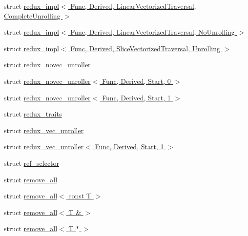 \begin{DoxyCompactItemize}
\item 
struct \hyperlink{struct_eigen_1_1internal_1_1redux__impl_3_01_func_00_01_derived_00_01_linear_vectorized_traversal_00_01_complete_unrolling_01_4}{redux\+\_\+impl$<$ Func, Derived, Linear\+Vectorized\+Traversal, Complete\+Unrolling $>$}
\item 
struct \hyperlink{struct_eigen_1_1internal_1_1redux__impl_3_01_func_00_01_derived_00_01_linear_vectorized_traversal_00_01_no_unrolling_01_4}{redux\+\_\+impl$<$ Func, Derived, Linear\+Vectorized\+Traversal, No\+Unrolling $>$}
\item 
struct \hyperlink{struct_eigen_1_1internal_1_1redux__impl_3_01_func_00_01_derived_00_01_slice_vectorized_traversal_00_01_unrolling_01_4}{redux\+\_\+impl$<$ Func, Derived, Slice\+Vectorized\+Traversal, Unrolling $>$}
\item 
struct \hyperlink{struct_eigen_1_1internal_1_1redux__novec__unroller}{redux\+\_\+novec\+\_\+unroller}
\item 
struct \hyperlink{struct_eigen_1_1internal_1_1redux__novec__unroller_3_01_func_00_01_derived_00_01_start_00_010_01_4}{redux\+\_\+novec\+\_\+unroller$<$ Func, Derived, Start, 0 $>$}
\item 
struct \hyperlink{struct_eigen_1_1internal_1_1redux__novec__unroller_3_01_func_00_01_derived_00_01_start_00_011_01_4}{redux\+\_\+novec\+\_\+unroller$<$ Func, Derived, Start, 1 $>$}
\item 
struct \hyperlink{struct_eigen_1_1internal_1_1redux__traits}{redux\+\_\+traits}
\item 
struct \hyperlink{struct_eigen_1_1internal_1_1redux__vec__unroller}{redux\+\_\+vec\+\_\+unroller}
\item 
struct \hyperlink{struct_eigen_1_1internal_1_1redux__vec__unroller_3_01_func_00_01_derived_00_01_start_00_011_01_4}{redux\+\_\+vec\+\_\+unroller$<$ Func, Derived, Start, 1 $>$}
\item 
struct \hyperlink{struct_eigen_1_1internal_1_1ref__selector}{ref\+\_\+selector}
\item 
struct \hyperlink{struct_eigen_1_1internal_1_1remove__all}{remove\+\_\+all}
\item 
struct \hyperlink{struct_eigen_1_1internal_1_1remove__all_3_01const_01_t_01_4}{remove\+\_\+all$<$ const T $>$}
\item 
struct \hyperlink{struct_eigen_1_1internal_1_1remove__all_3_01_t_01_6_01_4}{remove\+\_\+all$<$ T \& $>$}
\item 
struct \hyperlink{struct_eigen_1_1internal_1_1remove__all_3_01_t_01_5_01_4}{remove\+\_\+all$<$ T $\ast$ $>$}

\end{DoxyCompactItemize}
